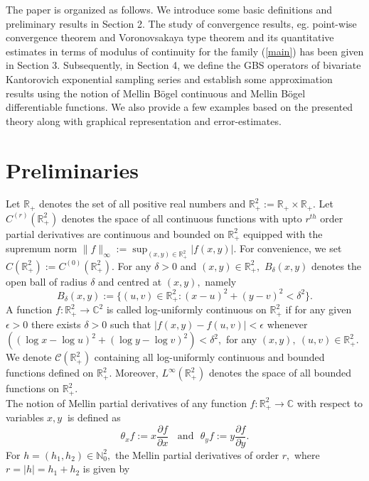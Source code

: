 \documentclass[12pt]{article}
\begin{document}
{The paper is organized as follows. We introduce some basic definitions and preliminary results in Section 2. The study of convergence results, eg. point-wise convergence theorem and Voronovsakaya type theorem and its quantitative estimates in terms of modulus of continuity for the family (\ref{main}) has been given in Section 3. Subsequently, in Section 4, we define the GBS operators of bivariate Kantorovich exponential sampling series and establish some approximation results using the notion of Mellin B\"{o}gel continuous and Mellin B\"{o}gel differentiable functions. We also provide a few examples based on the presented theory along with graphical representation and error-estimates.

\section{Preliminaries}
Let $\mathbb{R}_{+}$ denotes the set of all positive real numbers and $\mathbb{R}^{2}_{+} := \mathbb{R}_{+} \times \mathbb{R}_{+}.$ Let $ C^{(r)}(\mathbb{R} ^{2}_{+})$ denotes the space of all continuous functions with upto $r^{th}$ order partial derivatives are continuous and bounded on $ \mathbb{R}^{2}_{+}$ equipped with the supremum norm $\|f\|_{\infty} := \sup_{(x,y) \in \mathbb{R} ^{2}_{+}} |f(x,y)|.$ For convenience, we set $C(\mathbb{R} ^{2}_{+}):= C^{(0)}(\mathbb{R} ^{2}_{+}).$ For any $\delta >0$ and $(x,y) \in \mathbb{R} ^{2}_{+},$ $B_{\delta}(x,y)$ denotes  the open ball of radius $\delta$ and centred at $(x,y),$ namely
$$B_{\delta}(x,y) := \{ (u,v) \in \mathbb{R} ^{2}_{+} : (x-u)^{2}+(y-v)^{2} < \delta^{2}\}.$$
A function $f: \mathbb{R}^{2}_{+} \rightarrow \mathbb{C}^{2}$ is called log-uniformly continuous on $\mathbb{R}^{2}_{+}$ if for any given
$\epsilon > 0$ there exists $\delta > 0$ such that $|f(x,y) -f(u,v)| < \epsilon $ whenever $ \left( (\log x - \log u)^{2}+(\log y - \log v)^{2} \right) < \delta^{2},$ for any $(x,y),\ (u,v) \in \mathbb{R}^{2}_{+}.$ We denote $\mathcal{C}(\mathbb{R}^{2}_{+})$ containing all log-uniformly continuous and bounded functions defined on  $\mathbb{R}^{2}_{+}.$ Moreover, $L^{\infty}(\mathbb{R}^{2}_{+}) $ denotes the space of all bounded functions on  $\mathbb{R}^{2}_{+}.$\\
The notion of Mellin partial derivatives of any function $f:\mathbb{R}^{2}_{+} \rightarrow \mathbb{C}$ with respect to variables $x,y \ $ is defined as
$$ \theta_{x}f := x \frac{\partial f}{\partial x} \ \ \ \ \mbox{and} \ \ \ \theta_{y}f := y \frac{\partial f}{\partial y}.$$
For $h=(h_{1},h_{2}) \in \mathbb{N}_{0}^{2},$ the Mellin partial derivatives of order $r,$ where $r=|h|=h_{1}+h_{2}$ is given by
}
\end{document}
